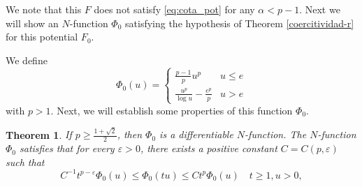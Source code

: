 \documentclass[twoside]{article}
\newtheorem{thm}{Theorem}[section]
\theoremstyle{remark}
\renewcommand{\leq}{\leqslant}
\renewcommand{\geq}{\geqslant}
\begin{document}
 We note that this $F$ does not satisfy \eqref{eq:cota_pot} for any $\alpha<p-1$.  
Next we will show  an $N$-function $\Phi_0$ satisfying the hypothesis of Theorem \ref{coercitividad-r} for this potential $F_0$.


We define
\[\Phi_0(u)=
\left\{
\begin{array}{ll}
\frac{p-1}{p}u^p&u\leq e
\\
\frac{u^p}{\log u}-\frac{e^p}{p}&u>e
\end{array}
\right.\]
with $p>1$. Next, we will establish some properties of this function $\Phi_0$.

\begin{thm}
If $p\geq \frac{1+\sqrt 2}{2}$, then $\Phi_0$ is a differentiable $N$-function. 
The $N$-function $\Phi_0$ satisfies that for every $\varepsilon>0$, there exists a positive constant $C=C(p,\varepsilon)$  such that
\begin{equation}\label{cota-sup-indices}
C^{-1}t^{p-\varepsilon}\Phi_0(u)\leq \Phi_0(tu) \leq Ct^p\Phi_0(u)\quad t\geq 1, u>0,
\end{equation}

\end{thm}
\end{document}
